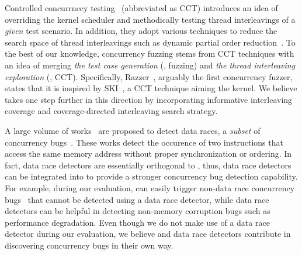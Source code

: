 %
Controlled concurrnecy testing~\cite{ski, pctalgorithm, sparsernr,
  chess, nagarakatte2012multicore, abdelrasoul2017promoting,
  cai2016radius, mukherjee2020learning, schedulebounding} (abbreviated
as CCT) introduces an idea of overriding the kernel scheduler and
methodically testing thread interleavings of a \textit{given} test
scenario.
%
In addition, they adopt various techniques to reduce the search space
of thread interleavings such as
%
%
dynamic partial order reduction~\cite{dpor1, dpor2, dpor3}.
%
To the best of our knowledge, concurrency fuzzing stems from CCT
techniques with an idea of merging \textit{the test case generation}
(\ie, fuzzing) and \textit{the thread interleaving exploration} (\ie,
CCT).
%
Specifically, Razzer~\cite{razzer}, arguably the first concurrency
fuzzer, states that it is inspired by SKI~\cite{ski}, a CCT technique
aiming the kernel.
%
We believe \sys takes one step further in this direction by
incorporating informative interleaving coverage and coverage-directed
interleaving search strategy.
%
%



%
A large volume of works~\cite{pacer, datacollider, hybridchecker,
  literace, helgrind, frost, prorace, tsan, kcsan, txrace} are
proposed to detect data races, a \textit{subset} of concurrency
bugs~\cite{lkmm, linuxmemorymodel}.
%
These works detect the occurence of two instructions that access the
same memory address without proper synchronization or ordering.
%
In fact, data race detectors are essentially orthogonal to \sys,
thus, data race detectors can be integrated into \sys to provide a
stronger concurrency bug detection capability.
%
For example, during our evaluation, \sys can easily trigger non-data
race concurrency bugs~\cite{snowboardbug, cve20196974, cve20177533}
that cannot be detected using a data race detector, while data race
detectors can be helpful in detecting non-memory corruption bugs such
as performance degradation.
%
Even though we do not make use of a data race detector during our
evaluation, we believe \sys and data race detectors contribute in
discovering concurrency bugs in their own way.





